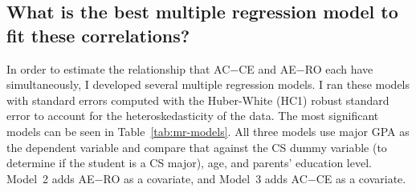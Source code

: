 \subsection{What is the best multiple regression model to fit these correlations?}
In order to estimate the relationship that AC$-$CE and AE$-$RO each have simultaneously, I developed several multiple regression models. I ran these models with standard errors computed with the Huber-White (HC1) robust standard error to account for the heteroskedasticity of the data. The most significant models can be seen in Table~\ref{tab:mr-models}. All three models use major GPA as the dependent variable and compare that against the CS dummy variable (to determine if the student is a CS major), age, and parents' education level. Model~2 adds AE$-$RO as a covariate, and Model~3 adds AC$-$CE as a covariate.

